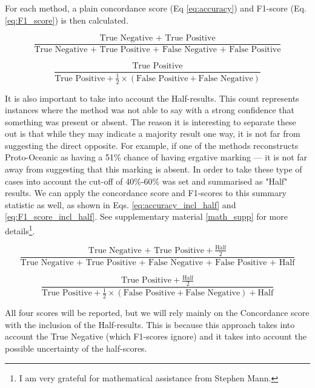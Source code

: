 \documentclass[a4paper,10pt]{article} %
\begin{document}
For each method, a plain concordance score (Eq \eqref{eq:accuracy}) and F1-score (Eq. \eqref{eq:F1_score}) is then calculated.

\begin{equation}\label{eq:accuracy}
\frac{\text{True Negative + True Positive}}{\text{True Negative + True Positive + False Negative + False Positive}}
\end{equation}

\begin{equation}\label{eq:F1_score}
\frac{\text{True Positive} }
{\text{True Positive} + \frac{1}{2}\times(\text{False Positive} + \text{False Negative})}
\end{equation}

It is also important to take into account the Half-results. This count represents instances where the method was not able to say with a strong confidence that something was present or absent. The reason it is interesting to separate these out is that while they may indicate a majority result one way, it is not far from suggesting the direct opposite. For example, if one of the methods reconstructs Proto-Oceanic as having a 51\% chance of having ergative marking --- it is not far away from suggesting that this marking is absent. In order to take these type of cases into account the cut-off of 40\%-60\% was set and summarised as "Half" results. We can apply the concordance score and F1-scores to this summary statistic as well, as shown in Eqs. \eqref{eq:accuracy_incl_half} and \eqref{eq:F1_score_incl_half}. See supplementary material \ref{math_supp} for more details\footnote{I am very grateful for mathematical assistance from Stephen Mann.}.

\begin{equation}\label{eq:accuracy_incl_half}
\frac{\text{True Negative + True Positive} + \frac{\text{Half}}{2}}{\text{True Negative + True Positive + False Negative + False Positive + Half}}
\end{equation}

\begin{equation}\label{eq:F1_score_incl_half}
\frac{\text{True Positive} +  \frac{\text{Half}}{2}} 
{\text{True Positive} + \frac{1}{2}\times(\text{False Positive} + \text{False Negative}) + \text{Half}}
\end{equation}


All four scores will be reported, but we will rely mainly on the Concordance score with the inclusion of the Half-results. This is because this approach takes into account the True Negative (which F1-scores ignore) and it takes into account the possible uncertainty of the half-scores.
\end{document}
